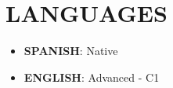 \documentclass{article}
\begin{document}
\section*{LANGUAGES}
\begin{itemize}[left=0pt]
	\item \textbf{SPANISH}: Native
	\item \textbf{ENGLISH}: Advanced {-} C1
\end{itemize}
\end{document}
